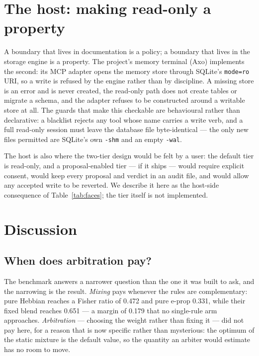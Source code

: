 \documentclass[11pt]{article}
\begin{document}
\section{The host: making read-only a property}
\label{sec:host}

A boundary that lives in documentation is a policy; a boundary that lives in the
storage engine is a property. The project's memory terminal (Axo) implements the
second: its MCP adapter opens the memory store through SQLite's
\texttt{mode=ro} URI, so a write is refused by the engine rather than by discipline.
A missing store is an error and is never created, the read-only path does not
create tables or migrate a schema, and the adapter refuses to be constructed around
a writable store at all. The guards that make this checkable are behavioural rather
than declarative: a blacklist rejects any tool whose name carries a write verb, and
a full read-only session must leave the database file byte-identical --- the only
new files permitted are SQLite's own \texttt{-shm} and an empty \texttt{-wal}.

The host is also where the two-tier design would be felt by a user: the default
tier is read-only, and a proposal-enabled tier --- if it ships --- would require
explicit consent, would keep every proposal and verdict in an audit file, and would
allow any accepted write to be reverted. We describe it here as the host-side
consequence of Table~\ref{tab:faces}; the tier itself is not implemented.

\section{Discussion}

\subsection{When does arbitration pay?}

The benchmark answers a narrower question than the one it was built to ask, and the narrowing is
the result. \emph{Mixing} pays whenever the rules are complementary: pure Hebbian reaches a Fisher
ratio of 0.472 and pure e-prop 0.331, while their fixed blend reaches 0.651 --- a margin of 0.179
that no single-rule arm approaches. \emph{Arbitration} --- choosing the weight rather than fixing
it --- did not pay here, for a reason that is now specific rather than mysterious: the optimum of
the static mixture is the default value, so the quantity an arbiter would estimate has no room to
move.
\end{document}
